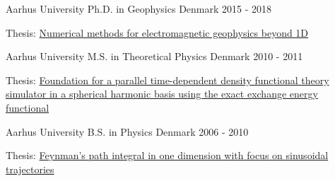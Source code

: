 

\begin{cventries}

  \cventry
  {Aarhus University} %
  {Ph.D. in Geophysics} %
    {Denmark} %
    {2015 - 2018} %
    {
      \begin{cvitems} %
        \item {Thesis: \href{https://www.forskningsdatabasen.dk/en/catalog/2392633187}{Numerical methods for electromagnetic geophysics beyond 1D}}
      \end{cvitems}
    }

  \cventry
  {Aarhus University} %
  {M.S. in Theoretical Physics} %
    {Denmark} %
    {2010 - 2011} %
    {
      \begin{cvitems} %
        \item {Thesis: \href{https://phys.au.dk/fileadmin/site_files/forskning/ltc/theses/thesistue.pdf}{Foundation for a parallel time-dependent density functional theory simulator in a spherical harmonic basis using the exact exchange energy functional}}
      \end{cvitems}
    }

  \cventry
  {Aarhus University} %
  {B.S. in Physics} %
    {Denmark} %
    {2006 - 2010} %
    {
      \begin{cvitems} %
        \item {Thesis: \href{https://users-phys.au.dk/~fedorov/subatom/bachelor/tue-feynman-path.pdf}{Feynman's path integral in one dimension with focus on sinusoidal \mbox{trajectories}}}
      \end{cvitems}
    }

\end{cventries}
